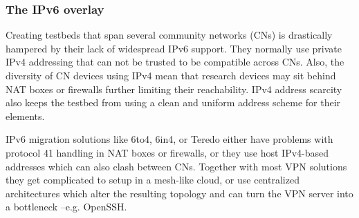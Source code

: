 \documentclass[conference]{IEEEtran}
\begin{document}



\subsubsection{The IPv6 overlay}

Creating testbeds that span several community networks (CNs) is drastically
hampered by their lack of widespread IPv6 support.  They normally use private
IPv4 addressing that
can not be trusted to be compatible across CNs.  Also,
the diversity of CN devices using IPv4 mean that research devices may sit
behind NAT boxes or firewalls further limiting their reachability.  IPv4
address scarcity also keeps the testbed from using a clean and uniform
address scheme for their elements.


IPv6 migration solutions like 6to4, 6in4,
or Teredo either have problems with protocol 41
handling in NAT boxes or firewalls, or they use host IPv4-based addresses which can
also clash between CNs.  Together with most VPN solutions they get complicated to
setup in a mesh-like cloud, or use centralized architectures which alter the
resulting topology and can turn the VPN server into a bottleneck --e.g. OpenSSH.

\end{document}
